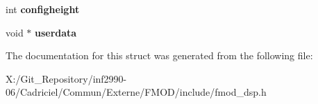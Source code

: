 \begin{DoxyCompactItemize}
\item 
\hypertarget{struct_f_m_o_d___d_s_p___d_e_s_c_r_i_p_t_i_o_n_a896589017397442724a4e26a6aa2d921}{int {\bfseries configheight}}\label{struct_f_m_o_d___d_s_p___d_e_s_c_r_i_p_t_i_o_n_a896589017397442724a4e26a6aa2d921}

\item 
\hypertarget{struct_f_m_o_d___d_s_p___d_e_s_c_r_i_p_t_i_o_n_a1610f0c65c07582271120060e36e9d87}{void $\ast$ {\bfseries userdata}}\label{struct_f_m_o_d___d_s_p___d_e_s_c_r_i_p_t_i_o_n_a1610f0c65c07582271120060e36e9d87}

\end{DoxyCompactItemize}


The documentation for this struct was generated from the following file\-:\begin{DoxyCompactItemize}
\item 
X\-:/\-Git\-\_\-\-Repository/inf2990-\/06/\-Cadriciel/\-Commun/\-Externe/\-F\-M\-O\-D/include/fmod\-\_\-dsp.\-h\end{DoxyCompactItemize}
